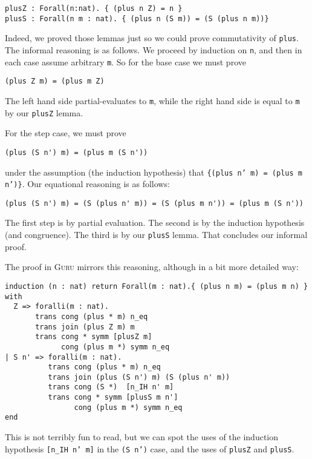 \documentclass{book}[12pt]
\newcommand{\guru}[0]{\textsc{Guru}\xspace}
\begin{document}
\begin{verbatim}
plusZ : Forall(n:nat). { (plus n Z) = n }
plusS : Forall(n m : nat). { (plus n (S m)) = (S (plus n m))}
\end{verbatim}

\noindent Indeed, we proved those lemmas just so we could prove commutativity of \texttt{plus}.
The informal reasoning is as follows.  We proceed by induction on \texttt{n}, and then in
each case assume arbitrary \texttt{m}.  So for the base case we must prove

\begin{verbatim}
(plus Z m) = (plus m Z)
\end{verbatim}

\noindent The left hand side partial-evaluates to \texttt{m}, while the right hand side is
equal to \texttt{m} by our \texttt{plusZ} lemma.  

For the step case, we must prove

\begin{verbatim}
(plus (S n') m) = (plus m (S n'))
\end{verbatim}

\noindent under the assumption (the induction hypothesis) that
\texttt{\{(plus n' m) = (plus m n')\}}.  Our equational reasoning is
as follows:

\begin{verbatim}
(plus (S n') m) = (S (plus n' m)) = (S (plus m n')) = (plus m (S n'))
\end{verbatim}

\noindent The first step is by partial evaluation.  The second is by
the induction hypothesis (and congruence).  The third is by our
\texttt{plusS} lemma.  That concludes our informal proof.

The proof in \guru mirrors this reasoning, although in a bit more
detailed way:

\begin{verbatim}
induction (n : nat) return Forall(m : nat).{ (plus n m) = (plus m n) } with
  Z => foralli(m : nat).
       trans cong (plus * m) n_eq
       trans join (plus Z m) m
       trans cong * symm [plusZ m]
             cong (plus m *) symm n_eq
| S n' => foralli(m : nat).
          trans cong (plus * m) n_eq
          trans join (plus (S n') m) (S (plus n' m))
          trans cong (S *)  [n_IH n' m]
          trans cong * symm [plusS m n']
                cong (plus m *) symm n_eq
end
\end{verbatim}

\noindent This is not terribly fun to read, but we can spot the uses
of the induction hypothesis \texttt{[n\_IH n' m]} in the \texttt{(S
n')} case, and the uses of \texttt{plusZ} and \texttt{plusS}.
\end{document}
